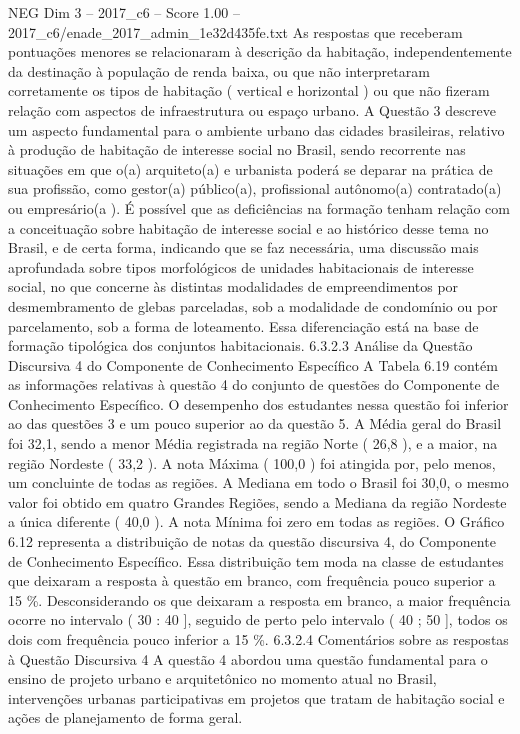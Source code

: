 \begin{textsample}{NEG Dim 3 – 2017\_c6 – Score 1.00 – 2017\_c6/enade\_2017\_admin\_1e32d435fe.txt}
As respostas que receberam pontuações menores se relacionaram à descrição da habitação, independentemente da destinação à população de renda baixa, ou que não interpretaram corretamente os tipos de habitação ( vertical e horizontal ) ou que não fizeram relação com aspectos de infraestrutura ou espaço urbano.
A Questão 3 descreve um aspecto fundamental para o ambiente urbano das cidades brasileiras, relativo à produção de habitação de interesse social no Brasil, sendo recorrente nas situações em que o(a) arquiteto(a) e urbanista poderá se deparar na prática de sua profissão, como gestor(a) público(a), profissional autônomo(a) contratado(a) ou empresário(a ).
É possível que as deficiências na formação tenham relação com a conceituação sobre habitação de interesse social e ao histórico desse tema no Brasil, e de certa forma, indicando que se faz necessária, uma discussão mais aprofundada sobre tipos morfológicos de unidades habitacionais de interesse social, no que concerne às distintas modalidades de empreendimentos por desmembramento de glebas parceladas, sob a modalidade de condomínio ou por parcelamento, sob a forma de loteamento.
Essa diferenciação está na base de formação tipológica dos conjuntos habitacionais. 6.3.2.3 Análise da Questão Discursiva 4 do Componente de Conhecimento Específico A Tabela 6.19 contém as informações relativas à questão 4 do conjunto de questões do Componente de Conhecimento Específico.
O desempenho dos estudantes nessa questão foi inferior ao das questões 3 e um pouco superior ao da questão 5.
A Média geral do Brasil foi 32,1, sendo a menor Média registrada na região Norte ( 26,8 ), e a maior, na região Nordeste ( 33,2 ).
A nota Máxima ( 100,0 ) foi atingida por, pelo menos, um concluinte de todas as regiões.
A Mediana em todo o Brasil foi 30,0, o mesmo valor foi obtido em quatro Grandes Regiões, sendo a Mediana da região Nordeste a única diferente ( 40,0 ).
A nota Mínima foi zero em todas as regiões.
O Gráfico 6.12 representa a distribuição de notas da questão discursiva 4, do Componente de Conhecimento Específico.
Essa distribuição tem moda na classe de estudantes que deixaram a resposta à questão em branco, com frequência pouco superior a 15 \%.
Desconsiderando os que deixaram a resposta em branco, a maior frequência ocorre no intervalo ( 30 : 40 ], seguido de perto pelo intervalo ( 40 ; 50 ], todos os dois com frequência pouco inferior a 15 \%. 6.3.2.4 Comentários sobre as respostas à Questão Discursiva 4 A questão 4 abordou uma questão fundamental para o ensino de projeto urbano e arquitetônico no momento atual no Brasil, intervenções urbanas participativas em projetos que tratam de habitação social e ações de planejamento de forma geral.

\end{textsample}
